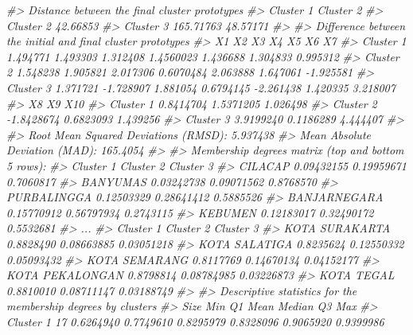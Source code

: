 \documentclass[
  oneside]{book}
\newenvironment{Shaded}{\begin{snugshade}}{\end{snugshade}}
\newcommand{\CommentTok}[1]{\textcolor[rgb]{0.56,0.35,0.01}{\textit{#1}}}
\begin{document}
\begin{Shaded}
\begin{Highlighting}[]
\CommentTok{\#\textgreater{} Distance between the final cluster prototypes}
\CommentTok{\#\textgreater{}           Cluster 1 Cluster 2}
\CommentTok{\#\textgreater{} Cluster 2  42.66853          }
\CommentTok{\#\textgreater{} Cluster 3 165.71763  48.57171}
\CommentTok{\#\textgreater{} }
\CommentTok{\#\textgreater{} Difference between the initial and final cluster prototypes}
\CommentTok{\#\textgreater{}                 X1        X2       X3        X4        X5       X6        X7}
\CommentTok{\#\textgreater{} Cluster 1 1.494771  1.493303 1.312408 1.4560023  1.436688 1.304833  0.995312}
\CommentTok{\#\textgreater{} Cluster 2 1.548238  1.905821 2.017306 0.6070484  2.063888 1.647061 {-}1.925581}
\CommentTok{\#\textgreater{} Cluster 3 1.371721 {-}1.728907 1.881054 0.6794145 {-}2.261438 1.420335  3.218007}
\CommentTok{\#\textgreater{}                   X8        X9      X10}
\CommentTok{\#\textgreater{} Cluster 1  0.8414704 1.5371205 1.026498}
\CommentTok{\#\textgreater{} Cluster 2 {-}1.8428674 0.6823093 1.439256}
\CommentTok{\#\textgreater{} Cluster 3  3.9199240 0.1186289 4.444407}
\CommentTok{\#\textgreater{} }
\CommentTok{\#\textgreater{} Root Mean Squared Deviations (RMSD): 5.937438 }
\CommentTok{\#\textgreater{} Mean Absolute Deviation (MAD): 165.4054 }
\CommentTok{\#\textgreater{} }
\CommentTok{\#\textgreater{} Membership degrees matrix (top and bottom 5 rows): }
\CommentTok{\#\textgreater{}               Cluster 1  Cluster 2 Cluster 3}
\CommentTok{\#\textgreater{} CILACAP      0.09432155 0.19959671 0.7060817}
\CommentTok{\#\textgreater{} BANYUMAS     0.03242738 0.09071562 0.8768570}
\CommentTok{\#\textgreater{} PURBALINGGA  0.12503329 0.28641412 0.5885526}
\CommentTok{\#\textgreater{} BANJARNEGARA 0.15770912 0.56797934 0.2743115}
\CommentTok{\#\textgreater{} KEBUMEN      0.12183017 0.32490172 0.5532681}
\CommentTok{\#\textgreater{} ...}
\CommentTok{\#\textgreater{}                 Cluster 1  Cluster 2  Cluster 3}
\CommentTok{\#\textgreater{} KOTA SURAKARTA  0.8828490 0.08663885 0.03051218}
\CommentTok{\#\textgreater{} KOTA SALATIGA   0.8235624 0.12550332 0.05093432}
\CommentTok{\#\textgreater{} KOTA SEMARANG   0.8117769 0.14670134 0.04152177}
\CommentTok{\#\textgreater{} KOTA PEKALONGAN 0.8798814 0.08784985 0.03226873}
\CommentTok{\#\textgreater{} KOTA TEGAL      0.8810010 0.08711147 0.03188749}
\CommentTok{\#\textgreater{} }
\CommentTok{\#\textgreater{} Descriptive statistics for the membership degrees by clusters}
\CommentTok{\#\textgreater{}           Size       Min        Q1      Mean    Median        Q3       Max}
\CommentTok{\#\textgreater{} Cluster 1   17 0.6264940 0.7749610 0.8295979 0.8328096 0.9065920 0.9399986}

\end{Highlighting}
\end{Shaded}
\end{document}
